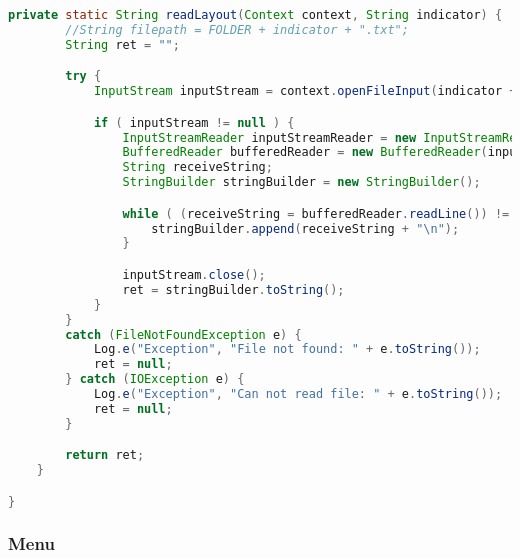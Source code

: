 \begin{lstlisting}[caption=TileLayoutLoader,label=list:TileLayoutLoader,language=Java]
    private static String readLayout(Context context, String indicator) {
        //String filepath = FOLDER + indicator + ".txt";
        String ret = "";

        try {
            InputStream inputStream = context.openFileInput(indicator + ".csv");

            if ( inputStream != null ) {
                InputStreamReader inputStreamReader = new InputStreamReader(inputStream);
                BufferedReader bufferedReader = new BufferedReader(inputStreamReader);
                String receiveString;
                StringBuilder stringBuilder = new StringBuilder();

                while ( (receiveString = bufferedReader.readLine()) != null ) {
                    stringBuilder.append(receiveString + "\n");
                }

                inputStream.close();
                ret = stringBuilder.toString();
            }
        }
        catch (FileNotFoundException e) {
            Log.e("Exception", "File not found: " + e.toString());
            ret = null;
        } catch (IOException e) {
            Log.e("Exception", "Can not read file: " + e.toString());
            ret = null;
        }

        return ret;
    }

}
\end{lstlisting}   

\subsubsection{Menu} 

